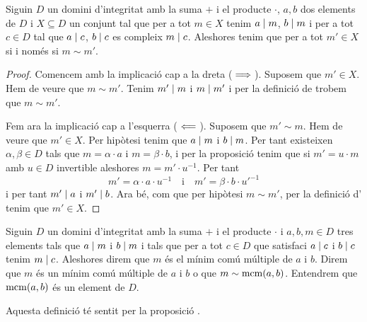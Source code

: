 \documentclass[../Apunts.tex]{subfiles}
\begin{document}
	\begin{proposition}
		\label{prop:mínim comú múltiple anells}
		Siguin \(D\) un domini d'integritat amb la suma \(+\) i el producte \(\cdot\), \(a,b\) dos elements de \(D\) i \(X\subseteq D\) un conjunt tal que per a tot \(m\in X\) tenim \(a\mathrel{|} m\), \(b\mathrel{|} m\) i per a tot \(c\in D\) tal que \(a\mathrel{|} c\), \(b\mathrel{|} c\) es compleix \(m\mathrel{|} c\). Aleshores tenim que per a tot \(m'\in X\) si i només si \(m\sim m'\).
		\begin{proof}
			Comencem amb la implicació cap a la dreta (\(\implies\)). Suposem que \(m'\in X\). Hem de veure que \(m\sim m'\). Tenim \(m'\mathrel{|} m\) i \(m\mathrel{|} m'\) i per la definició de  trobem que \(m\sim m'\). %
			
			Fem ara la implicació cap a l'esquerra (\(\impliedby\)). Suposem que \(m'\sim m\). Hem de veure que \(m'\in X\). Per hipòtesi tenim que \(a\mathrel{|} m\) i \(b\mathrel{|} m\). Per tant existeixen \(\alpha,\beta\in D\) tals que \(m=\alpha\cdot a\) i \(m=\beta\cdot b\), i per la proposició  tenim que si \(m'=u\cdot m\) amb \(u\in D\) invertible aleshores \(m=m'\cdot u^{-1}\). Per tant
			\[m'=\alpha\cdot a\cdot u^{-1}\quad\text{i}\quad m'=\beta\cdot b\cdot{u'}^{-1}\]
			i per tant \(m'\mathrel{|} a\) i \(m'\mathrel{|} b\). Ara bé, com que per hipòtesi \(m\sim m'\), per la definició d' tenim que \(m'\in X\). %
		\end{proof}
	\end{proposition}
	\begin{definition}
		\label{def:mínim comú múltiple anells}
		\label{def:mcm anells}
		Siguin \(D\) un domini d'integritat amb la suma \(+\) i el producte \(\cdot\) i \(a,b,m\in D\) tres elements tals que \(a\mathrel{|} m\) i \(b\mathrel{|} m\) i tals que per a tot \(c\in D\) que satisfaci \(a\mathrel{|} c\) i \(b\mathrel{|} c\) tenim \(m\mathrel{|} c\). Aleshores direm que \(m\) és el mínim comú múltiple de \(a\) i \(b\). Direm que \(m\) és un mínim comú múltiple de \(a\) i \(b\) o que \(m\sim\operatorname{mcm}(a,b)\).
		Entendrem que \(\operatorname{mcm}(a,b)\) és un element de \(D\).
		
		Aquesta definició té sentit per la proposició .
	\end{definition}
\end{document}
